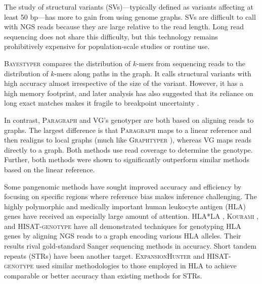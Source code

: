 The study of structural variants (SVs)---typically defined as variants affecting at least 50 bp---has more to gain from using genome graphs.
SVs are difficult to call with NGS reads because they are large relative to the read length.
Long read sequencing does not share this difficulty, but this technology remains prohibitively expensive for population-scale studies or routine use.

\textsc{Bayestyper} \cite{sibbesen2018accurate} compares the distribution of $k$-mers from sequencing reads to the distribution of $k$-mers along paths in the graph.
It calls structural variants with high accuracy almost irrespective of the size of the variant.
However, it has a high memory footprint, and later analysis has also suggested that its reliance on long exact matches makes it fragile to breakpoint uncertainty \cite{hickey2019genotyping}.

In contrast, \textsc{Paragraph} \cite{chen2019paragraph} and \textsc{VG}'s genotyper \cite{hickey2019genotyping} are both based on aligning reads to graphs.
The largest difference is that \textsc{Paragraph} maps to a linear reference and then realigns to local graphs (much like \textsc{Graphtyper} \cite{eggertsson2017graphtyper}), whereas VG maps reads directly to a graph.
Both methods use read coverage to determine the genotype.
Further, both methods were shown to significantly outperform similar methods based on the linear reference.

Some pangenomic methods have sought improved accuracy and efficiency by focusing on specific regions where reference bias makes inference challenging. 
The highly polymorphic and medically important human leukocyte antigen (HLA) genes have received an especially large amount of attention.
\textsc{HLA*LA} \cite{dilthey2019hla}, \textsc{Kourami} \cite{lee2018kourami}, and \textsc{HISAT-genotype} \cite{Kim_2019} have all demonstrated techniques for genotyping HLA genes by aligning NGS reads to a graph encoding various HLA alleles.
Their results rival gold-standard Sanger sequencing methods in accuracy.
Short tandem repeats (STRs) have been another target.
\textsc{ExpansionHunter} \cite{dolzhenko2019expansionhunter} and \textsc{HISAT-genotype} \cite{Kim_2019} used similar methodologies to those employed in HLA to achieve comparable or better accuracy than existing methods for STRs.

